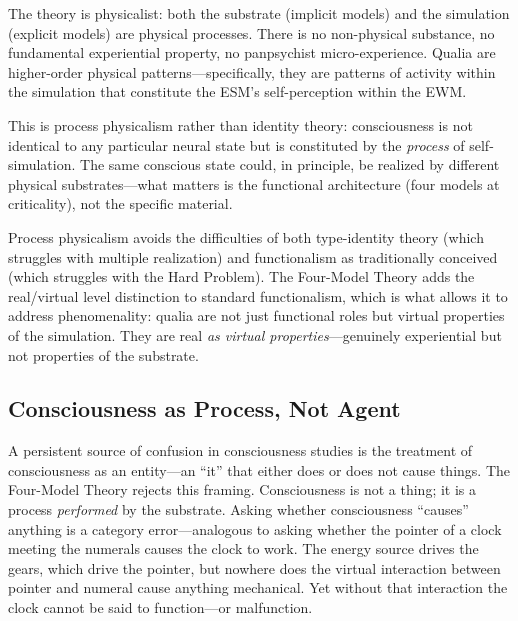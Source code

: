 \documentclass[12pt]{article}
\begin{document}
The theory is physicalist: both the substrate (implicit models) and the simulation (explicit models) are physical processes. There is no non-physical substance, no fundamental experiential property, no panpsychist micro-experience. Qualia are higher-order physical patterns---\hspace{0pt}specifically, they are patterns of activity within the simulation that constitute the ESM's self-perception within the EWM.

This is process physicalism rather than identity theory: consciousness is not identical to any particular neural state but is constituted by the \emph{process} of self-simulation. The same conscious state could, in principle, be realized by different physical substrates---\hspace{0pt}what matters is the functional architecture (four models at criticality), not the specific material.

Process physicalism avoids the difficulties of both type-identity theory (which struggles with multiple realization) and functionalism as traditionally conceived (which struggles with the Hard Problem). The Four-Model Theory adds the real/virtual level distinction to standard functionalism, which is what allows it to address phenomenality: qualia are not just functional roles but virtual properties of the simulation. They are real \emph{as virtual properties}---\hspace{0pt}genuinely experiential but not properties of the substrate.


\subsection{Consciousness as Process, Not Agent}

A persistent source of confusion in consciousness studies is the treatment of consciousness as an entity---\hspace{0pt}an ``it'' that either does or does not cause things. The Four-Model Theory rejects this framing. Consciousness is not a thing; it is a process \emph{performed} by the substrate. Asking whether consciousness ``causes'' anything is a category error---\hspace{0pt}analogous to asking whether the pointer of a clock meeting the numerals causes the clock to work. The energy source drives the gears, which drive the pointer, but nowhere does the virtual interaction between pointer and numeral cause anything mechanical. Yet without that interaction the clock cannot be said to function---\hspace{0pt}or malfunction.
\end{document}
